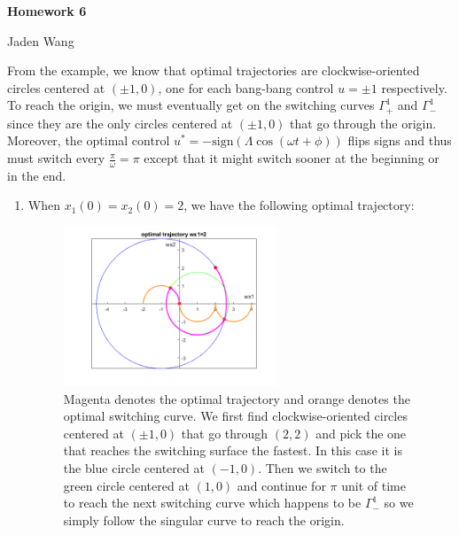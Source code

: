 \documentclass[12pt]{article}
\begin{document}
\centerline {\textsf{\textbf{\LARGE{Homework 6}}}}
\centerline {Jaden Wang}
\vspace{.15in}
\begin{problem}[1]
From the example, we know that optimal trajectories are clockwise-oriented circles centered at $ (\pm 1,0)$, one for each bang-bang control $ u = \pm 1$ respectively. To reach the origin, we must eventually get on the switching curves $ \Gamma_+^{1} $ and $ \Gamma_{-}^{1}$ since they are the only circles centered at $ (\pm1,0)$ that go through the origin. Moreover, the optimal control $ u^*  = - \text{sign}(\Lambda \cos(\omega t + \phi))$ flips signs and thus must switch every  $ \frac{\pi}{ \omega} = \pi$ except that it might switch sooner at the beginning or in the end. 

\begin{enumerate}[label=(\alph*)]
\item When $ x_1(0) = x_2(0)=2$, we have the following optimal trajectory:
~\begin{figure}[H]
	\centering
	\includegraphics[width=0.6\textwidth]{./figures/6.1.png}
\caption{Magenta denotes the optimal trajectory and orange denotes the optimal switching curve. We first find clockwise-oriented circles centered at $ (\pm 1,0)$ that go through $ (2,2)$ and pick the one that reaches the switching surface the fastest. In this case it is the blue circle centered at  $ (-1,0)$. Then we switch to the green circle centered at $ (1,0)$ and continue for $ \pi$ unit of time to reach the next switching curve which happens to be $ \Gamma_{-}^{1}$ so we simply follow the singular curve to reach the origin.}
\end{figure}


\end{enumerate}
\end{problem}
\end{document}

